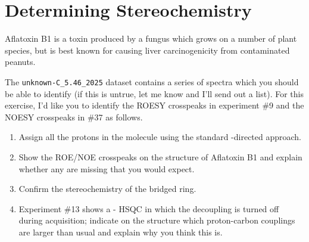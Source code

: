 \documentclass[../psets.tex]{subfiles}
\begin{document}
\section{Determining Stereochemistry}
Aflatoxin B1 is a toxin produced by a fungus which grows on a number of plant species, but is best known for causing liver carcinogenicity from contaminated peanuts.
\begin{center}
    \footnotesize
\end{center}
The \verb|unknown-C_5.46_2025| dataset contains a series of spectra which you should be able to identify (if this is untrue, let me know and I'll send out a list). For this exercise, I'd like you to identify the ROESY crosspeaks in experiment \#9 and the NOESY crosspeaks in \#37 as follows.
\begin{enumerate}
    \item Assign all the protons in the molecule using the standard -directed approach.
    \item Show the ROE/NOE crosspeaks on the structure of Aflatoxin B1 and explain whether any are missing that you would expect.
    \item Confirm the stereochemistry of the bridged ring.
    \item Experiment \#13 shows a - HSQC in which the decoupling is turned off during acquisition; indicate on the structure which proton-carbon couplings are larger than usual and explain why you think this is.
\end{enumerate}
\end{document}
